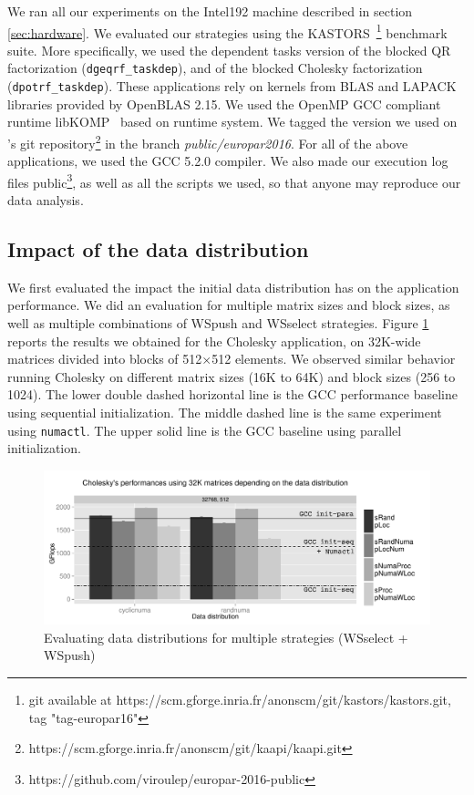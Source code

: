 \documentclass[parallelisme]{compas2016}
\begin{document}
We ran all our experiments on the Intel192 machine described in section \ref{sec:hardware}.
We evaluated our strategies using the KASTORS~\cite{virouleau:hal-01081974}\footnote{git available at https://scm.gforge.inria.fr/anonscm/git/kastors/kastors.git, tag "tag-europar16"} benchmark suite.
More specifically, we used the dependent tasks version of the blocked QR factorization
(\verb/dgeqrf_taskdep/), and of the blocked Cholesky factorization (\verb/dpotrf_taskdep/).
These applications rely on kernels from BLAS and LAPACK libraries provided by OpenBLAS 2.15.
We used the OpenMP GCC compliant runtime libKOMP~\cite{libkomp} based on \kaapi runtime system. We tagged the version we used on \kaapi's
git repository\footnote{https://scm.gforge.inria.fr/anonscm/git/kaapi/kaapi.git } in the branch \emph{public/europar2016}.
For all of the above applications, we used the GCC 5.2.0 compiler.
We also made our execution log files public\footnote{https://github.com/viroulep/europar-2016-public}, as well as all the scripts we used, so that
anyone may reproduce our data analysis.

\subsection{Impact of the data distribution}

We first evaluated the impact the initial data distribution has on the application performance. We did an evaluation for multiple matrix sizes and block sizes,
as well as multiple combinations of WSpush and WSselect strategies. Figure \ref{fig:eval-distrib} reports the
results we obtained for the Cholesky application, on 32K-wide matrices divided into blocks of 512$\times$512 elements. We observed similar behavior running Cholesky on different matrix sizes (16K to 64K) and block sizes (256 to 1024).
The lower double dashed horizontal line is the GCC performance baseline using
sequential initialization. The middle dashed line is the same experiment using
\verb/numactl/. The upper solid line is the GCC baseline using parallel initialization.

\begin{figure}[t]
  \centering
  \includegraphics[scale=0.5]{figures/graph_distrib.pdf}
  \caption{Evaluating data distributions for multiple strategies (WSselect + WSpush)}
\label{fig:eval-distrib}
\end{figure}
\end{document}
